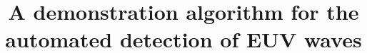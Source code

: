 \documentclass[12pt]{iopart}
\begin{document}
\title{A demonstration algorithm for the automated detection of EUV waves}





\maketitle














{}
\end{document}
